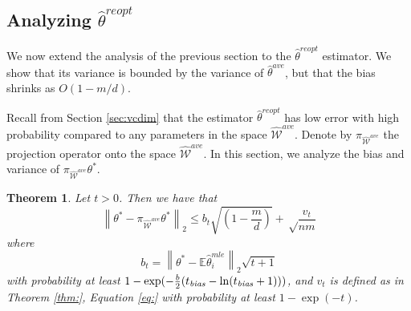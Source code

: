 \documentclass[twoside]{article}
\newtheorem{theorem}{Theorem}
\DeclareMathOperator*{\vecspan}{span}
\DeclareMathOperator*{\affspan}{aff}
\newcommand{\W}{\mathcal{\hat W}}
\newcommand{\Wave}{{\mathcal{\hat W}^{ave}}}
\newcommand{\Wtave}{{\mathcal{W}^{ave,*}}}
\newcommand{\A}{\mathcal{A}}
\newcommand{\E}{\mathbb{E}}
\newcommand{\w}{\theta}
\newcommand{\wreopt}{\hat\w^{reopt}}
\newcommand{\wave}{\hat\w^{ave}}
\newcommand{\wtave}{\hat\w^{ave,*}}
\newcommand{\wmle}{\hat\w^{mle}}
\newcommand{\wstar}{{\w^{*}}}
\newcommand{\tbias}{t_{\text{\textit{bias}}}}
\newcommand{\ltwo}[1]{{\left\lVert {#1} \right\rVert}_2}
\newcommand{\proj}[1]{\pi_{{#1}}}
\begin{document}
\subsection{Analyzing $\wreopt$}
\label{sec:analreopt}

We now extend the analysis of the previous section to the $\wreopt$ estimator.
We show that its variance is bounded by the variance of $\wave$,
but that the bias shrinks as $O(1-m/d)$.

Recall from Section \ref{sec:vcdim} that the estimator $\wreopt$ has low error with high probability compared to any parameters in the space $\Wave$.
Denote by $\proj\Wave$ the projection operator onto the space $\Wave$.
In this section, we analyze the bias and variance of $\proj\Wave\wstar$.

\begin{theorem}
Let $t>0$.
Then we have that
\begin{equation}
\ltwo{\wstar-\proj\Wave\wstar}
\le
b_t\sqrt{\left(1-\frac{m}{d}\right)}
+
\sqrt\frac{v_{t}}{nm}
\end{equation}
where
\begin{equation}
b_t = \ltwo{\wstar-\E\wmle_i}\sqrt{t + 1}
\end{equation}
with probability at least $1-\exp (-\frac{b}{2} (\tbias-\ln(\tbias+1)))$,
and $v_t$ is defined as in Theorem \ref{thm:}, Equation \ref{eq:} with probability at least $1-\exp(-t)$.
\end{theorem}
\end{document}
